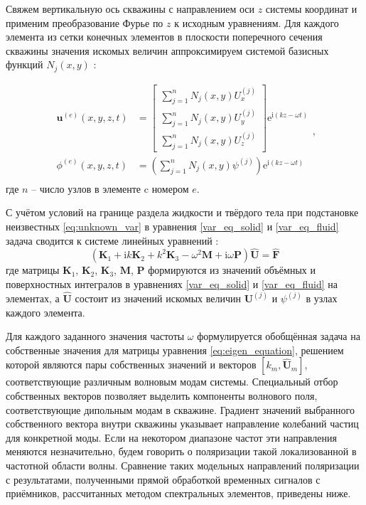 \documentclass[a4paper,11pt]{article}
\newcommand{\ii}{\mathrm{i}}
\begin{document}
Свяжем вертикальную ось скважины с направлением оси $z$ системы координат и применим преобразование Фурье по $z$ к исходным уравнениям. Для каждого элемента из сетки конечных элементов в плоскости поперечного сечения скважины значения искомых величин аппроксимируем системой базисных функций $N_j(x,y)$ \cite{Zienkiewicz2000}:

\begin{equation}
\begin{split}
\mathbf{u}^{(e)}(x,y,z,t) &= \left[
\begin{array}{c}
\sum_{j=1}^{n}N_j(x,y)U_{x}^{(j)} \\
\sum_{j=1}^{n}N_j(x,y)U_{y}^{(j)} \\
\sum_{j=1}^{n}N_j(x,y)U_{z}^{(j)} 
\end{array}
\right] \mathrm{e}^{\ii (kz-\omega t)} %
\\
\phi^{(e)}(x,y,z,t) &= \left(\sum_{j=1}^{n}N_j(x,y)\psi^{(j)} \right) \mathrm{e}^{\ii (kz-\omega t)} %
\\
\end{split}, \label{eq:unknown_var}
\end{equation}
где $n$ -- число узлов в элементе c номером $e$.  

С учётом условий на границе раздела жидкости и твёрдого тела при подстановке неизвестных \eqref{eq:unknown_var} в уравнения \eqref{var_eq_solid} и \eqref{var_eq_fluid} задача сводится к системе линейных уравнений \cite{Bartoli2006,Treyssede2013}:
\begin{equation}
(\mathbf{K}_1 + \ii k \mathbf{K}_2 + k^2 \mathbf{K}_3 - \omega^2 \mathbf{M} + \ii \omega \mathbf{P}) \hat{\mathbf{U}} = \hat{\mathbf{F}} \label{eq:eigen_equation}
\end{equation}
где матрицы $\mathbf{K}_1$, $\mathbf{K}_2$, $\mathbf{K}_3$, $\mathbf{M}$, $\mathbf{P}$ формируются из значений объёмных и поверхностных интегралов в уравнениях \eqref{var_eq_solid} и \eqref{var_eq_fluid} на элементах, а $ \hat{\mathbf{U}}$ состоит из значений искомых величин $\mathbf{U}^{(j)}$ и $\psi^{(j)}$ в узлах каждого элемента. 

Для каждого заданного значения частоты $\omega$ формулируется обобщённая задача на собственные значения для матрицы уравнения \eqref{eq:eigen_equation}, решением которой являются пары собственных значений и векторов $[k_m, \hat{\mathbf{U}}_m]$, соответствующие различным волновым модам системы. Специальный отбор собственных векторов позволяет выделить компоненты волнового поля, соответствующие дипольным модам в скважине. Градиент значений выбранного собственного вектора внутри скважины указывает направление колебаний частиц для конкретной моды. Если на некотором диапазоне частот эти направления меняются незначительно, будем говорить о поляризации такой локализованной в частотной области волны. Сравнение таких модельных направлений поляризации с результатами, полученными прямой обработкой временных сигналов с приёмников, рассчитанных методом спектральных элементов, приведены ниже.
\end{document}
